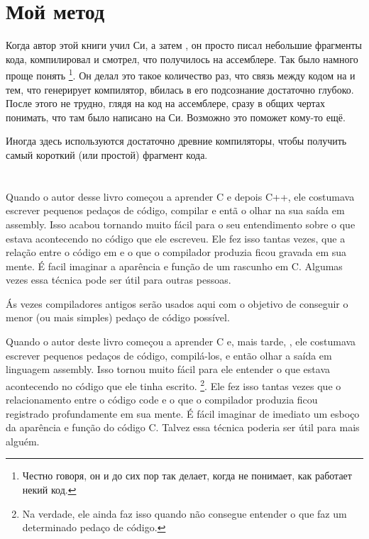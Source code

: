 \chapter{Мой метод}

Когда автор этой книги учил Си, а затем \Cpp, он просто писал небольшие фрагменты кода, компилировал и смотрел, что 
получилось на ассемблере. Так было намного проще понять%
\footnote{Честно говоря, он и до сих пор так делает, когда не понимает, как работает некий код.}.
Он делал это такое количество раз, что связь между кодом на \CCpp и тем, что генерирует компилятор, вбилась в его подсознание достаточно глубоко.
После этого не трудно, глядя на код на ассемблере, сразу в общих чертах понимать, что там было написано на Си. 
Возможно это поможет кому-то ещё.


Иногда здесь используются достаточно древние компиляторы, чтобы получить самый короткий (или простой) фрагмент кода.
\fi %

\ifdefined\BRAZILIAN
\chapter{\PTBRph{}}

Quando o autor desse livro começou a aprender C e depois C++, ele costumava escrever pequenos pedaços de código, compilar e entã o olhar na sua saída em assembly.
Isso acabou tornando muito fácil para o seu entendimento sobre o que estava acontecendo no código que ele escreveu.
Ele fez isso tantas vezes, que a relação entre o código em \CCpp e o que o compilador produzia ficou gravada em sua mente.
É facil imaginar a aparência e função de um rascunho em C. Algumas vezes essa técnica pode ser útil para outras pessoas.

Ás vezes compiladores antigos serão usados aqui com o objetivo de conseguir o menor (ou mais simples) pedaço de código possível.

\iffalse
Quando o autor deste livro começou a aprender C e, mais tarde, \Cpp, ele costumava escrever pequenos pedaços de código, compilá-los, 
e então olhar a saída em linguagem assembly. Isso tornou muito fácil para ele entender o que estava acontecendo no código que ele tinha escrito.
\footnote{Na verdade, ele ainda faz isso quando não consegue entender o que faz um determinado pedaço de código.}. 
Ele fez isso tantas vezes que o relacionamento entre o código \CCpp code e o que o compilador produzia ficou registrado profundamente em sua mente. 
É fácil imaginar de imediato um esboço da aparência e função do código C. 
Talvez essa técnica poderia ser útil para mais alguém.

